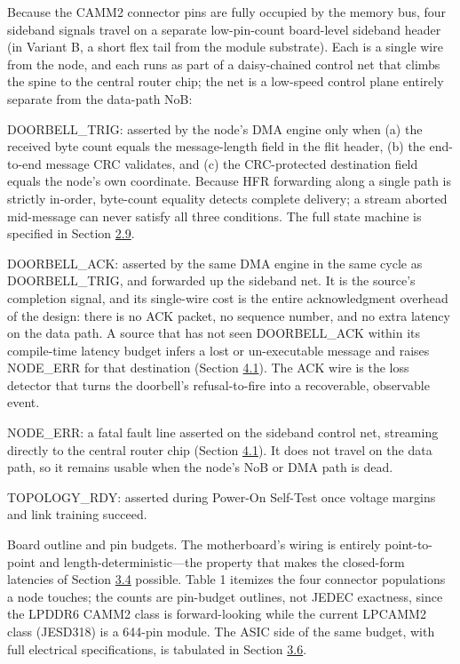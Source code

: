 \documentclass[12pt,onecolumn]{article}
\begin{document}
Because the CAMM2 connector pins are fully occupied by the memory bus, four sideband signals travel on a separate low-pin-count board-level sideband header (in Variant B, a short flex tail from the module substrate). Each is a single wire from the node, and each runs as part of a daisy-chained control net that climbs the spine to the central router chip; the net is a low-speed control plane entirely separate from the data-path NoB:

DOORBELL\_TRIG: asserted by the node's DMA engine only when (a) the received byte count equals the message-length field in the flit header, (b) the end-to-end message CRC validates, and (c) the CRC-protected destination field equals the node's own coordinate. Because HFR forwarding along a single path is strictly in-order, byte-count equality detects complete delivery; a stream aborted mid-message can never satisfy all three conditions. The full state machine is specified in Section \hyperref[sec:2.9]{2.9}.

DOORBELL\_ACK: asserted by the same DMA engine in the same cycle as DOORBELL\_TRIG, and forwarded up the sideband net. It is the source's completion signal, and its single-wire cost is the entire acknowledgment overhead of the design: there is no ACK packet, no sequence number, and no extra latency on the data path. A source that has not seen DOORBELL\_ACK within its compile-time latency budget infers a lost or un-executable message and raises NODE\_ERR for that destination (Section \hyperref[sec:4.1]{4.1}). The ACK wire is the loss detector that turns the doorbell's refusal-to-fire into a recoverable, observable event.

NODE\_ERR: a fatal fault line asserted on the sideband control net, streaming directly to the central router chip (Section \hyperref[sec:4.1]{4.1}). It does not travel on the data path, so it remains usable when the node's NoB or DMA path is dead.

TOPOLOGY\_RDY: asserted during Power-On Self-Test once voltage margins and link training succeed.

Board outline and pin budgets. The motherboard's wiring is entirely point-to-point and length-deterministic---the property that makes the closed-form latencies of Section \hyperref[sec:3.4]{3.4} possible. Table 1 itemizes the four connector populations a node touches; the counts are pin-budget outlines, not JEDEC exactness, since the LPDDR6 CAMM2 class is forward-looking while the current LPCAMM2 class (JESD318) is a 644-pin module\cite{16}. The ASIC side of the same budget, with full electrical specifications, is tabulated in Section \hyperref[sec:3.6]{3.6}.
\end{document}
